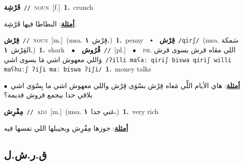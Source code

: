 \documentclass[10pt,a4paper,twoside]{article} %
\begin{document}
\begin{multicols}{2}
{\setlength\topsep{0pt}\textbf{\foreignlanguage{arabic}{قَرْشِة}}\ {\color{gray}\texttt{//}\color{black}}\ \textsc{noun}\ [f.]\ \textbf{1.}~crunch\  \begin{flushright}\color{gray}\foreignlanguage{arabic}{\textbf{\underline{\foreignlanguage{arabic}{أمثلة}}}: البطاطا فيها قَرْشِة.}\end{flushright}\color{black}} \vspace{2mm}

{\setlength\topsep{0pt}\textbf{\foreignlanguage{arabic}{قِرْش}}\ {\color{gray}\texttt{//}\color{black}}\ \textsc{noun}\ [m.]\ \color{gray}(msa. \foreignlanguage{arabic}{قِرْش}~\foreignlanguage{arabic}{\textbf{١.}})\color{black}\ \textbf{1.}~penny\ \ $\smblkdiamond$\ \ \setlength\topsep{0pt}\textbf{\foreignlanguage{arabic}{قِرْش}}\ {\color{gray}\texttt{/qirʃ/}\color{black}}\ \color{gray}(msa. \foreignlanguage{arabic}{سَمكة القِرْش}~\foreignlanguage{arabic}{\textbf{١.}})\color{black}\ \textbf{1.}~shark\ \ $\bullet$\ \ \setlength\topsep{0pt}\textbf{\foreignlanguage{arabic}{قْرُوش}}\ {\color{gray}\texttt{//}\color{black}}\ [pl.]\ \ $\bullet$\ \ \textsc{ph.} \color{gray} \foreignlanguage{arabic}{اللي معَاه قرش بسوى قرش وَاللي معهوش اشي مَا بسوى اشي}\color{black}\ {\color{gray}\texttt{/{\sffamily ʔilli maʕaː qiriʃ biswa qiriʃ willi maʕhuːʃ ʔiʃi maː biswa ʔiʃi}/}\color{black}}\ \textbf{1.}~money talks\  \begin{flushright}\color{gray}\foreignlanguage{arabic}{\textbf{\underline{\foreignlanguage{arabic}{أمثلة}}}: هاي الأيام اللِّي مَعاه قِرْش بسْوَى قِرْش واللي معهوش اشي ما بِسْوَى اشي\ $\bullet$\ \  بلاقي حدا بيجمع قروش قديمة؟}\end{flushright}\color{black}} \vspace{2mm}

{\setlength\topsep{0pt}\textbf{\foreignlanguage{arabic}{مِقْرِش}}\ {\color{gray}\texttt{//}\color{black}}\ \textsc{adj}\ [m.]\ \color{gray}(msa. \foreignlanguage{arabic}{غني جدا}~\foreignlanguage{arabic}{\textbf{١.}})\color{black}\ \textbf{1.}~very rich\  \begin{flushright}\color{gray}\foreignlanguage{arabic}{\textbf{\underline{\foreignlanguage{arabic}{أمثلة}}}: جوزها مِقْرِش وبجيبلها اللي نفسها فيه}\end{flushright}\color{black}} \vspace{2mm}

\vspace{-3mm}
\subsection*{\color{blue}\foreignlanguage{arabic}{ق.ر.ش.ل}\color{blue}{}} 


\end{multicols}
\end{document}
